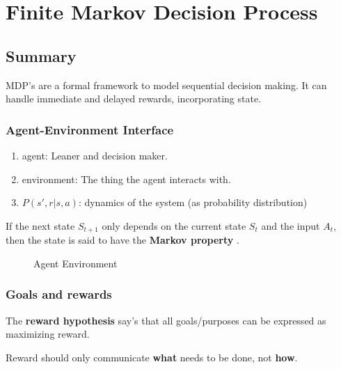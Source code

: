 \chapter{Finite Markov Decision Process}

\section{Summary}

MDP's are a formal framework to model sequential decision making. It can handle immediate and delayed rewards, incorporating state.

\subsection{Agent-Environment Interface}

\begin{enumerate}
	\item agent: Leaner and decision maker.
	\item environment: The thing the agent interacts with.
	\item $P(s', r|s,a)$: dynamics of the system (as probability distribution) 
\end{enumerate}

If the next state $S_{t+1}$ only depends on the current state $S_t$ and the input $A_t$, then the state is said to have the \textbf{Markov property} .

\begin{figure}[H]
	\centering
	\caption{Agent Environment}
	\label{fig:agent-enviroment}
\end{figure}

\subsection{Goals and rewards}

The \textbf{reward hypothesis} say's that all goals/purposes can be expressed as maximizing reward.

Reward should only communicate \textbf{what} needs to be done, not \textbf{how}.

